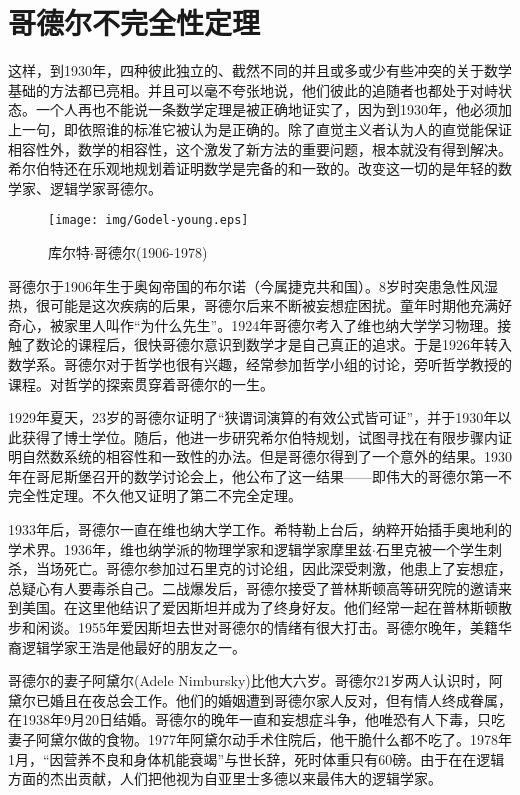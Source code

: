 \documentclass{article}
\begin{document}
\section{哥德尔不完全性定理}

这样，到1930年，四种彼此独立的、截然不同的并且或多或少有些冲突的关于数学基础的方法都已亮相。并且可以毫不夸张地说，他们彼此的追随者也都处于对峙状态。一个人再也不能说一条数学定理是被正确地证实了，因为到1930年，他必须加上一句，即依照谁的标准它被认为是正确的。除了直觉主义者认为人的直觉能保证相容性外，数学的相容性，这个激发了新方法的重要问题，根本就没有得到解决。希尔伯特还在乐观地规划着证明数学是完备的和一致的。改变这一切的是年轻的数学家、逻辑学家哥德尔。

\begin{wrapfigure}{L}{0.4\textwidth}
 \centering
 \texttt{[image: img/Godel-young.eps]}
 \captionsetup{labelformat=empty}
 \caption{库尔特$\cdot$哥德尔(1906-1978)}
 \label{fig:Godel-young}
\end{wrapfigure}

哥德尔于1906年生于奥匈帝国的布尔诺（今属捷克共和国）。8岁时突患急性风湿热，很可能是这次疾病的后果，哥德尔后来不断被妄想症困扰。童年时期他充满好奇心，被家里人叫作“为什么先生”。1924年哥德尔考入了维也纳大学学习物理。接触了数论的课程后，很快哥德尔意识到数学才是自己真正的追求。于是1926年转入数学系。哥德尔对于哲学也很有兴趣，经常参加哲学小组的讨论，旁听哲学教授的课程。对哲学的探索贯穿着哥德尔的一生。

1929年夏天，23岁的哥德尔证明了“狭谓词演算的有效公式皆可证”，并于1930年以此获得了博士学位。随后，他进一步研究希尔伯特规划，试图寻找在有限步骤内证明自然数系统的相容性和一致性的办法。但是哥德尔得到了一个意外的结果。1930年在哥尼斯堡召开的数学讨论会上，他公布了这一结果——即伟大的哥德尔第一不完全性定理。不久他又证明了第二不完全定理。

1933年后，哥德尔一直在维也纳大学工作。希特勒上台后，纳粹开始插手奥地利的学术界。1936年，维也纳学派的物理学家和逻辑学家摩里兹$\cdot$石里克被一个学生刺杀，当场死亡。哥德尔参加过石里克的讨论组，因此深受刺激，他患上了妄想症，总疑心有人要毒杀自己。二战爆发后，哥德尔接受了普林斯顿高等研究院的邀请来到美国。在这里他结识了爱因斯坦并成为了终身好友。他们经常一起在普林斯顿散步和闲谈。1955年爱因斯坦去世对哥德尔的情绪有很大打击。哥德尔晚年，美籍华裔逻辑学家王浩是他最好的朋友之一。

哥德尔的妻子阿黛尔(Adele Nimbursky)比他大六岁。哥德尔21岁两人认识时，阿黛尔已婚且在夜总会工作。他们的婚姻遭到哥德尔家人反对，但有情人终成眷属，在1938年9月20日结婚。哥德尔的晚年一直和妄想症斗争，他唯恐有人下毒，只吃妻子阿黛尔做的食物。1977年阿黛尔动手术住院后，他干脆什么都不吃了。1978年1月，“因营养不良和身体机能衰竭”与世长辞，死时体重只有60磅。由于在在逻辑方面的杰出贡献，人们把他视为自亚里士多德以来最伟大的逻辑学家。
\end{document}
